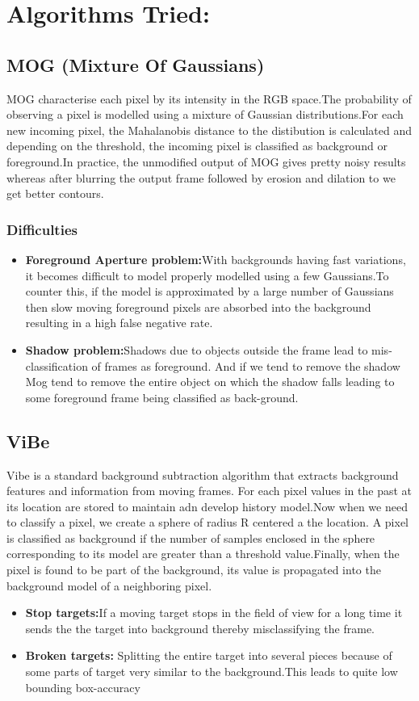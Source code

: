 \documentclass[12pt,a4paper]{report}
\begin{document}
\section*{Algorithms Tried:}
\subsection*{MOG (Mixture Of Gaussians)}
MOG characterise each pixel by its intensity in the RGB space.The probability of observing a pixel is modelled using a mixture of Gaussian distributions.For each new incoming pixel, the Mahalanobis distance to the distibution is calculated and depending on the threshold, the incoming pixel is classified as background or foreground.In practice, the unmodified output of MOG gives pretty noisy results whereas after blurring the output frame followed by erosion and dilation to we get better contours. 
\subsubsection{Difficulties}
\begin{itemize}
\item {\bf Foreground Aperture problem:}With backgrounds having fast variations, it becomes difficult to model properly modelled using a few Gaussians.To counter this, if the model is approximated by a large number of Gaussians then slow moving foreground pixels are absorbed into the background resulting in a high false negative rate. 
\item {\bf Shadow problem:}Shadows due to objects outside the frame lead to mis-classification of frames as foreground. And if we tend to remove the shadow Mog tend to remove the entire object on which the shadow falls leading to some foreground frame being classified as back-ground.
\end{itemize} 
\subsection*{ViBe}
Vibe is a standard background subtraction algorithm that extracts background features and information from moving frames.
For each pixel values in the past at  its location are stored to maintain adn develop  history model.Now when we need to classify a pixel, we create a sphere of radius R centered a the location. A pixel is classified as background if the number of samples enclosed in the sphere corresponding to its model are greater than a threshold value.Finally, when the pixel is found to be part of the background, its value is propagated into the background model of a neighboring pixel. 
\begin{itemize}
\item {\bf Stop targets:}If a moving target stops in the field of view for a long time it sends the the target into background thereby misclassifying the frame.
\item {\bf Broken targets:} Splitting the entire target into several pieces because of some parts of target very similar to the background.This leads to quite low bounding box-accuracy  
\end{itemize} 
\end{document}
